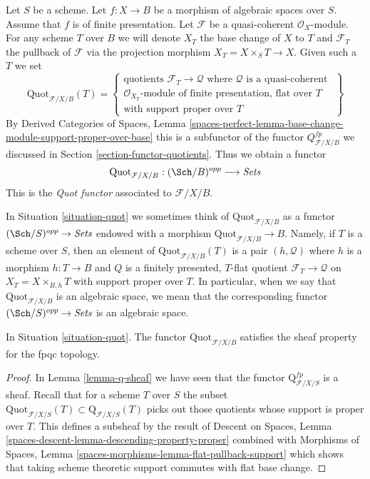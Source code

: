 \begin{situation}
\label{situation-quot}
Let $S$ be a scheme. Let $f : X \to B$ be a morphism of
algebraic spaces over $S$. Assume that $f$ is of finite presentation.
Let $\mathcal{F}$ be a quasi-coherent $\mathcal{O}_X$-module.
For any scheme $T$ over $B$ we will denote $X_T$ the base change of
$X$ to $T$ and $\mathcal{F}_T$ the pullback
of $\mathcal{F}$ via the projection morphism $X_T = X \times_S T \to X$.
Given such a $T$ we set
$$
\text{Quot}_{\mathcal{F}/X/B}(T) =
\left\{
\begin{matrix}
\text{quotients }\mathcal{F}_T \to \mathcal{Q}\text{ where }
\mathcal{Q}\text{ is a quasi-coherent }\\
\mathcal{O}_{X_T}\text{-module of finite presentation, flat over }T\\
\text{with support proper over }T
\end{matrix}
\right\}
$$
By Derived Categories of Spaces, Lemma
\ref{spaces-perfect-lemma-base-change-module-support-proper-over-base}
this is a subfunctor of the functor $Q^{fp}_{\mathcal{F}/X/B}$
we discussed in Section \ref{section-functor-quotients}.
Thus we obtain a functor
\begin{equation}
\label{equation-quot}
\text{Quot}_{\mathcal{F}/X/B} : (\Sch/B)^{opp} \longrightarrow \textit{Sets}
\end{equation}
This is the {\it Quot functor} associated to $\mathcal{F}/X/B$.
\end{situation}

\noindent
In Situation \ref{situation-quot} we sometimes think of
$\text{Quot}_{\mathcal{F}/X/B}$ as a functor
$(\Sch/S)^{opp} \to \textit{Sets}$ endowed
with a morphism $\text{Quot}_{\mathcal{F}/X/B} \to B$.
Namely, if $T$ is a scheme over $S$, then an element
of $\text{Quot}_{\mathcal{F}/X/B}(T)$ is a pair $(h, \mathcal{Q})$
where $h$ is a morphism $h : T \to B$
and $Q$ is a finitely presented, $T$-flat quotient
$\mathcal{F}_T \to \mathcal{Q}$ on $X_T = X \times_{B, h} T$
with support proper over $T$. In particular, when we say
that $\text{Quot}_{\mathcal{F}/X/B}$ is an algebraic space, we mean that the
corresponding functor $(\Sch/S)^{opp} \to \textit{Sets}$ is an algebraic space.

\begin{lemma}
\label{lemma-quot-sheaf}
In Situation \ref{situation-quot}. The functor $\text{Quot}_{\mathcal{F}/X/B}$
satisfies the sheaf property for the fpqc topology.
\end{lemma}

\begin{proof}
In Lemma \ref{lemma-q-sheaf} we have seen that the functor
$\text{Q}^{fp}_{\mathcal{F}/X/S}$ is a sheaf. Recall that for a
scheme $T$ over $S$ the subset
$\text{Quot}_{\mathcal{F}/X/S}(T) \subset \text{Q}_{\mathcal{F}/X/S}(T)$
picks out those quotients whose support is proper over $T$.
This defines a subsheaf by the result of
Descent on Spaces, Lemma \ref{spaces-descent-lemma-descending-property-proper}
combined with
Morphisms of Spaces, Lemma \ref{spaces-morphisms-lemma-flat-pullback-support}
which shows that taking scheme theoretic support commutes
with flat base change.
\end{proof}

